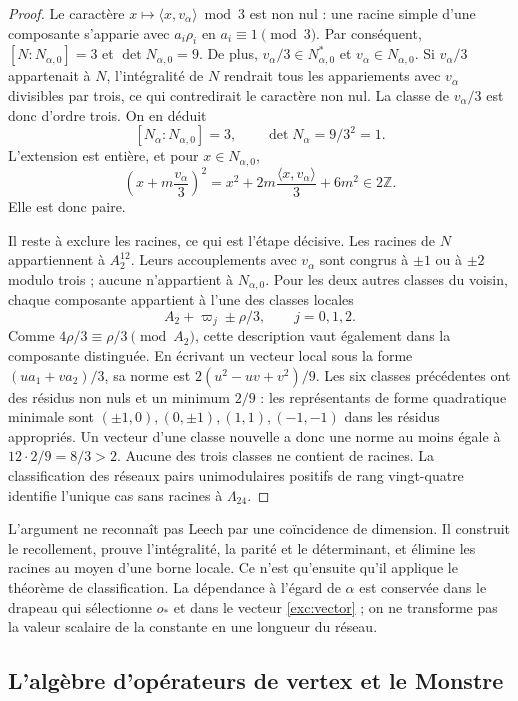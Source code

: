 \begin{proof}
Le caractère $x\mapsto\langle x,v_\alpha\rangle\bmod3$ est non nul :
une racine simple d'une composante s'apparie avec $a_i\rho_i$ en
$a_i\equiv1\pmod3$. Par conséquent, $[N:N_{\alpha,0}]=3$ et
$\det N_{\alpha,0}=9$. De plus,
$v_\alpha/3\in N_{\alpha,0}^*$ et $v_\alpha\in N_{\alpha,0}$.
Si $v_\alpha/3$ appartenait à $N$, l'intégralité de $N$ rendrait
tous les appariements avec $v_\alpha$ divisibles par trois,
ce qui contredirait le caractère non nul. La classe de $v_\alpha/3$ est
donc d'ordre trois. On en déduit
\[
 [N_\alpha:N_{\alpha,0}]=3,
 \qquad \det N_\alpha=9/3^2=1.
\]
L'extension est entière, et pour $x\in N_{\alpha,0}$,
\[
 \left(x+m\frac{v_\alpha}{3}\right)^2
   =x^2+2m\frac{\langle x,v_\alpha\rangle}{3}+6m^2
   \in2\mathbb Z.
\]
Elle est donc paire.

Il reste à exclure les racines, ce qui est l'étape décisive. Les racines de $N$ appartiennent à $A_2^{12}$. Leurs accouplements avec $v_\alpha$ sont congrus à $\pm1$ ou à $\pm2$ modulo trois ; aucune n'appartient à $N_{\alpha,0}$. Pour les deux autres classes du voisin, chaque composante appartient à l'une des classes locales
\[
 A_2+\varpi_j\pm\rho/3,\qquad j=0,1,2.
\]
Comme $4\rho/3\equiv\rho/3\pmod{A_2}$, cette description vaut
également dans la composante distinguée. En écrivant un vecteur local
sous la forme $(u a_1+v a_2)/3$, sa norme est
$2(u^2-uv+v^2)/9$. Les six classes précédentes ont des résidus non
nuls et un minimum $2/9$ : les représentants de forme quadratique minimale
sont $(\pm1,0),(0,\pm1),(1,1),(-1,-1)$ dans les résidus appropriés.
Un vecteur d'une classe nouvelle a donc une norme au moins égale à
$12\cdot2/9=8/3>2$. Aucune des trois classes ne contient de racines.
La classification des réseaux pairs unimodulaires positifs de
rang vingt-quatre identifie l'unique cas sans racines à
$\Lambda_{24}$.
\end{proof}

L'argument ne reconnaît pas Leech par une coïncidence de dimension.
Il construit le recollement, prouve l'intégralité, la parité et le déterminant, et
élimine les racines au moyen d'une borne locale. Ce n'est qu'ensuite qu'il applique le
théorème de classification. La dépendance à l'égard de $\alpha$ est conservée dans
le drapeau qui sélectionne $o_*$ et dans le vecteur \eqref{exc:vector} ;
on ne transforme pas la valeur scalaire de la constante en une longueur du
réseau.

\subsection{L'algèbre d'opérateurs de vertex et le Monstre}
\label{exc:voa}

